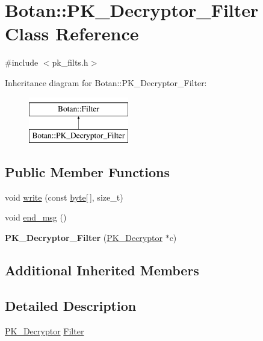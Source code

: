 \hypertarget{classBotan_1_1PK__Decryptor__Filter}{\section{Botan\-:\-:P\-K\-\_\-\-Decryptor\-\_\-\-Filter Class Reference}
\label{classBotan_1_1PK__Decryptor__Filter}
}


{\ttfamily \#include $<$pk\-\_\-filts.\-h$>$}

Inheritance diagram for Botan\-:\-:P\-K\-\_\-\-Decryptor\-\_\-\-Filter\-:\begin{figure}[H]
\begin{center}
\leavevmode
\includegraphics[height=2.000000cm]{classBotan_1_1PK__Decryptor__Filter}
\end{center}
\end{figure}
\subsection*{Public Member Functions}
\begin{DoxyCompactItemize}
\item 
void \hyperlink{classBotan_1_1PK__Decryptor__Filter_afc1a918fb5745eb44ad0227bc208891f}{write} (const \hyperlink{namespaceBotan_a7d793989d801281df48c6b19616b8b84}{byte}\mbox{[}$\,$\mbox{]}, size\-\_\-t)
\item 
void \hyperlink{classBotan_1_1PK__Decryptor__Filter_ab96f94bdd27739bec5bc818d5206de7f}{end\-\_\-msg} ()
\item 
\hypertarget{classBotan_1_1PK__Decryptor__Filter_a3ddae5afc3bcd9455b114aead9cda6f7}{{\bfseries P\-K\-\_\-\-Decryptor\-\_\-\-Filter} (\hyperlink{classBotan_1_1PK__Decryptor}{P\-K\-\_\-\-Decryptor} $\ast$c)}\label{classBotan_1_1PK__Decryptor__Filter_a3ddae5afc3bcd9455b114aead9cda6f7}

\end{DoxyCompactItemize}
\subsection*{Additional Inherited Members}


\subsection{Detailed Description}
\hyperlink{classBotan_1_1PK__Decryptor}{P\-K\-\_\-\-Decryptor} \hyperlink{classBotan_1_1Filter}{Filter} 

